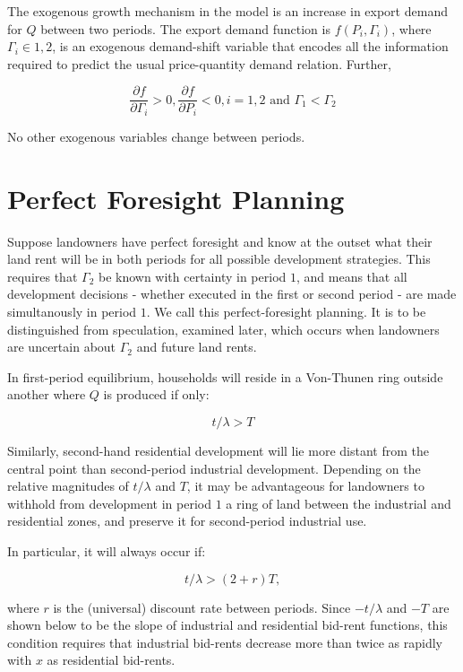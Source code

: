 The exogenous growth mechanism in the model is an increase in export demand for $Q$ between two periods. The export demand function is $f(P_i, \Gamma_i)$, where $\Gamma_i \in 1, 2$, is an exogenous demand-shift variable that encodes all the information required to predict the usual price-quantity demand relation. Further,

\begin{equation*}
    \frac{\partial f}{\partial \Gamma_i} > 0, \frac{\partial f}{\partial P_i} < 0, i = 1, 2 \text{ and } \Gamma_1 < \Gamma_2
\end{equation*}

No other exogenous variables change between periods.

\section{Perfect Foresight Planning}

Suppose landowners have perfect foresight and know at the outset what their land rent will be in both periods for all possible development strategies. This requires that $\Gamma_2$ be known with certainty in period $1$, and means that all development decisions - whether executed in the first or second period - are made simultanously in period $1$. We call this perfect-foresight planning. It is to be distinguished from speculation, examined later, which occurs when landowners are uncertain about $\Gamma_2$ and future land rents.

In first-period equilibrium, households will reside in a Von-Thunen ring outside another where $Q$ is produced if only:

\begin{equation*}
    t / \lambda > T
\end{equation*}

Similarly, second-hand residential development will lie more distant from the central point than second-period industrial development. Depending on the relative magnitudes of $t / \lambda$ and $T$, it may be advantageous for landowners to withhold from development in period $1$ a ring of land between the industrial and residential zones, and preserve it for second-period industrial use.

In particular, it will always occur if:

\begin{equation*}
    t / \lambda > (2 + r) T,
\end{equation*}

where $r$ is the (universal) discount rate between periods. Since $-t/\lambda$ and $-T$ are shown below to be the slope of industrial and residential bid-rent functions, this condition requires that industrial bid-rents decrease more than twice as rapidly with $x$ as residential bid-rents.

